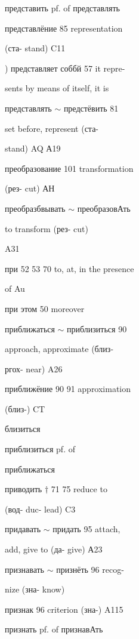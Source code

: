 \begin{minipage}[t]{0.475\textwidth}
\raggedright
\noindent представить pf. of представлять\par
\noindent представлёние 85 representation\par
\noindent (ста- stand) C11\par
\noindent ) представляет соббй 57 it repre-\par
\noindent sents by means of itself, it is\par
\noindent представлять $\sim$ предстёвить 81\par
{} set before, represent (ста-\par
\noindent stand) AQ А19\par
\noindent преобразование 101 transformation\par
\noindent (рез- cut) АН\par
\noindent преобразбвывать $\sim$ преобразовАть\par
{} to transform (рез- cut)\par
\noindent A31\par
\noindent при 52 53 70 to, at, in the presence\par
\noindent of Au\par
\noindent при этом 50 moreover\par
\noindent приближаться $\sim$ приблизиться 90\par
{} approach, approximate (близ-\par
\noindent ргох- near) A26\par
\noindent приближёние 90 91 approximation\par
\noindent (близ-) CT\par
\noindent близиться\par
\noindent приблизиться pf. of\par
\noindent приближаться\par
\noindent приводить $\dagger$ 71 75 reduce to\par
\noindent (вод- duc- lead) C3\par
\noindent придавать $\sim$ придать 95 attach,\par
\noindent add, give to (да- give) А23\par
\noindent признавать $\sim$ признёть 96 recog-\par
\noindent nize (зна- know)\par
\noindent признак 96 criterion (зна-) A115\par
{} признать pf. of признавАть\par

\end{minipage}
